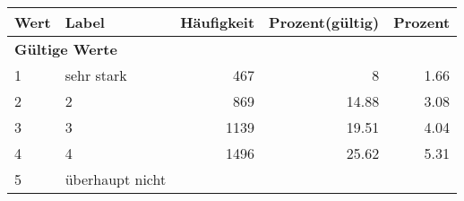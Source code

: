      \begin{longtable}{lXrrr}
     \toprule
     \textbf{Wert} & \textbf{Label} & \textbf{Häufigkeit} & \textbf{Prozent(gültig)} & \textbf{Prozent} \\
     \endhead
     \midrule
     \multicolumn{5}{l}{\textbf{Gültige Werte}}\\

     1 &
     \multicolumn{1}{X}{ sehr stark   } &


       \num{467} &
       \num[round-mode=places,round-precision=2]{8} &
         \num[round-mode=places,round-precision=2]{1.66} \\

     2 &
     \multicolumn{1}{X}{ 2   } &


       \num{869} &
       \num[round-mode=places,round-precision=2]{14.88} &
         \num[round-mode=places,round-precision=2]{3.08} \\

     3 &
     \multicolumn{1}{X}{ 3   } &


       \num{1139} &
       \num[round-mode=places,round-precision=2]{19.51} &
         \num[round-mode=places,round-precision=2]{4.04} \\

     4 &
     \multicolumn{1}{X}{ 4   } &


       \num{1496} &
       \num[round-mode=places,round-precision=2]{25.62} &
         \num[round-mode=places,round-precision=2]{5.31} \\

     5 &
     \multicolumn{1}{X}{ überhaupt nicht   } &



\end{longtable}
